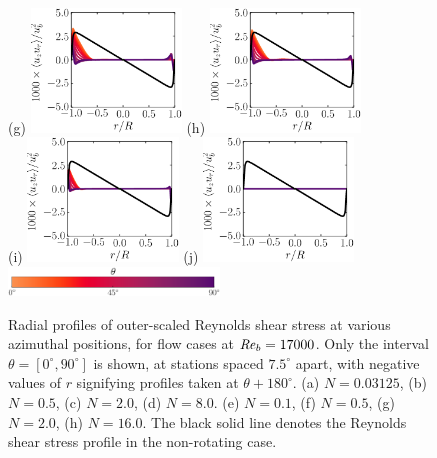 \documentclass[lineno]{jfm}
\begin{document}
\begin{figure}
               (g) \includegraphics[width=4cm]{Figures/prof_rssouter_rotz0_roty0.1875.eps}
               (h) \includegraphics[width=4cm]{Figures/prof_rssouter_rotz0_roty0.25.eps} \\
               (i) \includegraphics[width=4cm]{Figures/prof_rssouter_rotz0_roty0.5.eps}
               (j) \includegraphics[width=4cm]{Figures/prof_rssouter_rotz0_roty1.0.eps} \\
               \includegraphics[width=0.5\textwidth]{Figures/theta_cmap_half.eps} \\
       \caption{
               Radial profiles of
               outer-scaled Reynolds shear stress
               at various azimuthal positions,
               for flow cases at $\mbox{\textit{Re}}_b=17000$.
               Only the interval $\theta = [0^{\circ},90^{\circ}]$ is shown, at stations
               spaced $7.5^\circ$ apart, with negative values of $r$ signifying profiles
               taken at $\theta + 180^{\circ}$.
               (a) $N = 0.03125$,
               (b) $N = 0.5$,
               (c) $N = 2.0$,
               (d) $N = 8.0$.
               (e) $N = 0.1$,
               (f) $N = 0.5$,
               (g) $N = 2.0$,
               (h) $N = 16.0$.
               The black solid line denotes the Reynolds shear stress profile in the
               non-rotating case.
               }
               \label{fig:rss}
       \end{figure}
\end{document}
